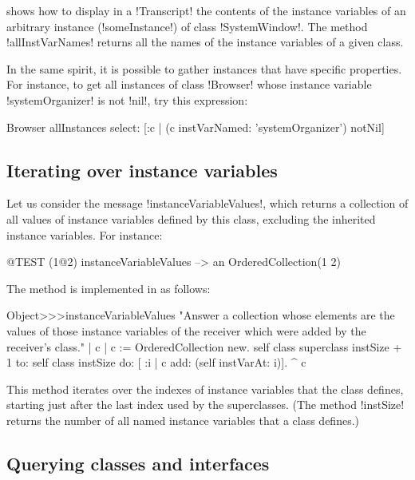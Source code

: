 \documentclass[a4paper,10pt,twoside]{book}
\begin{document}
 shows how to display in a \ct!Transcript! the contents of the instance variables of an arbitrary instance (\ct!someInstance!) of class \ct!SystemWindow!.
The method \ct!allInstVarNames! returns all the names of the instance variables of a given class.

In the same spirit, it is possible to gather instances that have specific properties.
For instance, to get all instances of class \ct!Browser! whose instance variable \ct!systemOrganizer! is not \ct!nil!, try this expression:
\begin{code}{}
Browser allInstances select: [:c | (c instVarNamed: 'systemOrganizer') notNil]
\end{code}

\subsection{Iterating over instance variables}

Let us consider the message \ct!instanceVariableValues!, which returns a collection of all values of instance variables defined by this class, excluding the inherited instance variables.
For instance:
\begin{code}{@TEST}
(1@2) instanceVariableValues --> an OrderedCollection(1 2)
\end{code}

The method is implemented in  as follows:
\begin{code}{}
Object>>>instanceVariableValues
	"Answer a collection whose elements are the values of those instance variables of the receiver which were added by the receiver's class."	
	| c |
	c := OrderedCollection new.
	self class superclass instSize + 1
		to: self class instSize
		do: [ :i | c add: (self instVarAt: i)].
	^ c
\end{code}

This method iterates over the indexes of instance variables that the class defines, starting just after the last index used by the superclasses.
(The method \ct!instSize! returns the number of all named instance variables that a class defines.)

\subsection{Querying classes and interfaces}
\end{document}
